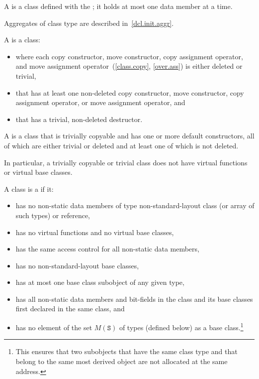 \pnum
A  is a class defined with the 
;
it holds at most one data member at a time.
\begin{note}
Aggregates of class type are described in~\ref{dcl.init.aggr}.
\end{note}

\pnum
{}%
A  is a class:

\begin{itemize}
\item where each copy constructor, move constructor, copy assignment operator,
and move assignment operator~(\ref{class.copy}, \ref{over.ass})
is either deleted or trivial,
\item that has at least one non-deleted copy constructor, move constructor,
copy assignment operator, or move assignment operator, and
\item that has a trivial, non-deleted destructor.
\end{itemize}

\pnum
{}%
A  is a class that is trivially copyable and
has one or more default constructors,
all of which are either trivial or deleted and
at least one of which is not deleted.
\begin{note} In particular, a trivially copyable or trivial class does not have
virtual functions or virtual base classes.\end{note}

\pnum
{}%
A class  is a  if it:
\begin{itemize}
\item has no non-static data members of type non-standard-layout class
(or array of such types) or reference,

\item has no virtual functions and no
virtual base classes,

\item has the same access control
for all non-static data members,

\item has no non-standard-layout base classes,

\item has at most one base class subobject of any given type,

\item has all non-static data members and bit-fields in the class and
its base classes first declared in the same class, and

\item has no element of the set $M(\mathtt{S})$ of types (defined below)
as a base class.\footnote{This ensures that two subobjects that have the
same class type and that
belong to the same most derived object are not allocated at the same
address.}
\end{itemize}

